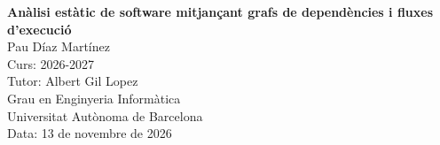 \begin{titlepage}

\vspace*{\fill}

\begin{center}

    {\Large\textbf{Anàlisi estàtic de software mitjançant grafs de dependències i fluxes d'execució}}\\[0.5em]

    Pau Díaz Martínez\\
    Curs: 2026-2027\\
    Tutor: Albert Gil Lopez\\
    Grau en Enginyeria Informàtica\\
    Universitat Autònoma de Barcelona\\
    Data: 13 de novembre de 2026

\end{center}

\vspace*{\fill}

\end{titlepage}
